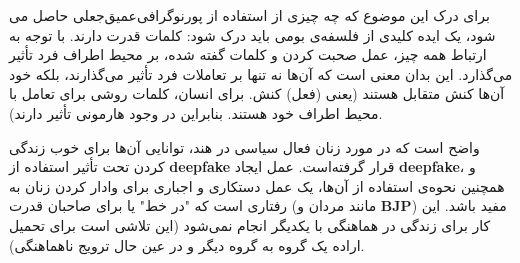 برای درک این موضوع که چه چیزی از استفاده از پورنوگرافی‌عمیق‌جعلی حاصل می شود، یک ایده کلیدی از فلسفه‌ی بومی باید درک شود: کلمات قدرت دارند.
با توجه به ارتباط همه چیز، عمل صحبت کردن و کلمات گفته شده، بر محیط اطراف فرد تأثیر می‌گذارد.
این بدان معنی است که آن‌ها نه تنها بر تعاملات فرد تأثیر می‌گذارند، بلکه خود آن‌ها کنش متقابل هستند (یعنی (فعل) کنش.
برای انسان، کلمات روشی برای تعامل با محیط اطراف خود هستند.
بنابراین در وجود هارمونی تأثیر دارند).

واضح است که در مورد زنان فعال سیاسی در هند، توانایی آن‌ها برای خوب زندگی کردن تحت تأثیر استفاده از \textenglish{\textbf{deepfake}} قرار گرفته‌است.
عمل ایجاد \textenglish{\textbf{deepfake}}، و همچنین نحوه‌ی استفاده از آن‌ها، یک عمل دستکاری و اجباری برای وادار کردن زنان به رفتاری است که "در خط" یا برای صاحبان قدرت (مانند مردان و \textenglish{\textbf{BJP}}) مفید باشد.
این کار برای زندگی در هماهنگی با یکدیگر انجام نمی‌شود (این تلاشی است برای تحمیل اراده یک گروه به گروه دیگر و در عین حال ترویج ناهماهنگی).





